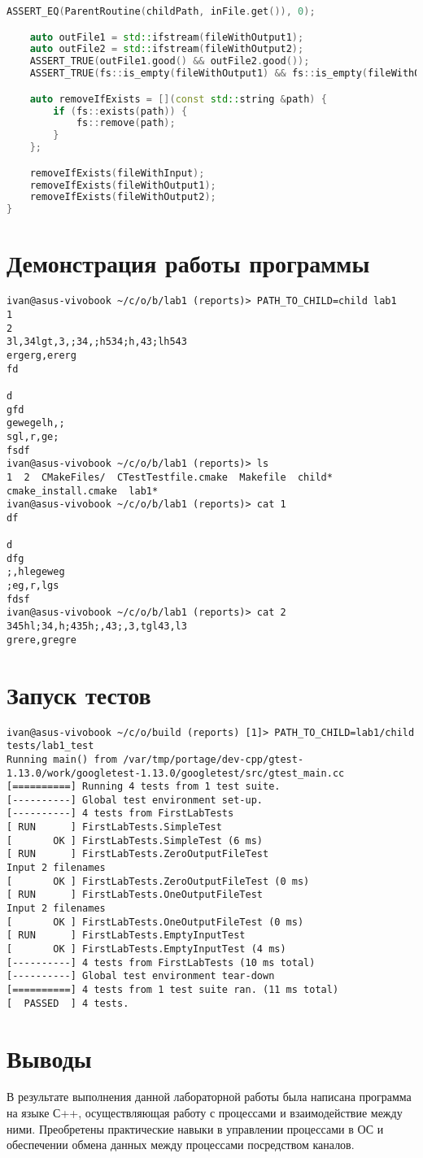 \documentclass[a4paper, 12pt]{article}
\begin{document}
\begin{lstlisting}[language=C++]
    ASSERT_EQ(ParentRoutine(childPath, inFile.get()), 0);

    auto outFile1 = std::ifstream(fileWithOutput1);
    auto outFile2 = std::ifstream(fileWithOutput2);
    ASSERT_TRUE(outFile1.good() && outFile2.good());
    ASSERT_TRUE(fs::is_empty(fileWithOutput1) && fs::is_empty(fileWithOutput2));

    auto removeIfExists = [](const std::string &path) {
        if (fs::exists(path)) {
            fs::remove(path);
        }
    };

    removeIfExists(fileWithInput);
    removeIfExists(fileWithOutput1);
    removeIfExists(fileWithOutput2);
}
\end{lstlisting}

\newpage
\section{Демонстрация работы программы}

\begin{verbatim}
ivan@asus-vivobook ~/c/o/b/lab1 (reports)> PATH_TO_CHILD=child lab1
1
2
3l,34lgt,3,;34,;h534;h,43;lh543
ergerg,ererg
fd

d
gfd
gewegelh,;
sgl,r,ge;
fsdf
ivan@asus-vivobook ~/c/o/b/lab1 (reports)> ls
1  2  CMakeFiles/  CTestTestfile.cmake  Makefile  child*  cmake_install.cmake  lab1*
ivan@asus-vivobook ~/c/o/b/lab1 (reports)> cat 1
df

d
dfg
;,hlegeweg
;eg,r,lgs
fdsf
ivan@asus-vivobook ~/c/o/b/lab1 (reports)> cat 2
345hl;34,h;435h;,43;,3,tgl43,l3
grere,gregre
\end{verbatim}

\section{Запуск тестов}
\begin{verbatim}
ivan@asus-vivobook ~/c/o/build (reports) [1]> PATH_TO_CHILD=lab1/child tests/lab1_test
Running main() from /var/tmp/portage/dev-cpp/gtest-1.13.0/work/googletest-1.13.0/googletest/src/gtest_main.cc
[==========] Running 4 tests from 1 test suite.
[----------] Global test environment set-up.
[----------] 4 tests from FirstLabTests
[ RUN      ] FirstLabTests.SimpleTest
[       OK ] FirstLabTests.SimpleTest (6 ms)
[ RUN      ] FirstLabTests.ZeroOutputFileTest
Input 2 filenames
[       OK ] FirstLabTests.ZeroOutputFileTest (0 ms)
[ RUN      ] FirstLabTests.OneOutputFileTest
Input 2 filenames
[       OK ] FirstLabTests.OneOutputFileTest (0 ms)
[ RUN      ] FirstLabTests.EmptyInputTest
[       OK ] FirstLabTests.EmptyInputTest (4 ms)
[----------] 4 tests from FirstLabTests (10 ms total)
[----------] Global test environment tear-down
[==========] 4 tests from 1 test suite ran. (11 ms total)
[  PASSED  ] 4 tests.
\end{verbatim}
\newpage
\section{Выводы}

В результате выполнения данной лабораторной работы была написана программа на языке С++, осуществляющая работу с процессами и 
взаимодействие между ними. Преобретены практические навыки в управлении процессами в ОС и обеспечении обмена данных между процессами посредством каналов.
\end{document}
